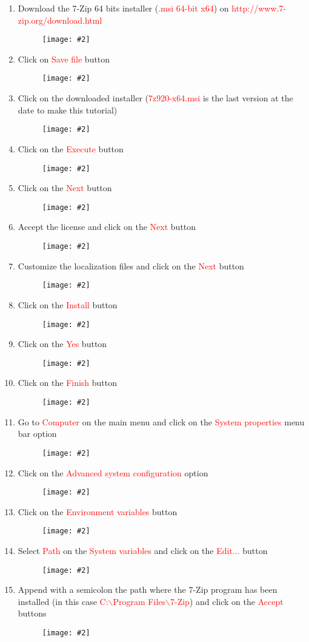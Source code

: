\documentclass[a4paper]{article}
\newcommand{\FIG}[2]
{
	\begin{figure}[ht!]
	\centering
	\texttt{[image: \#2]}
	\end{figure}
}
\newcommand{\FIGURE}[1]{\FIG{0.35}{#1}}
\newcommand{\RED}[1] {\textcolor{red}{#1}}
\begin{document}
\begin{enumerate}

\item Download the 7-Zip 64 bits installer (\RED{.msi 64-bit x64}) on \newline
\RED{http://www.7-zip.org/download.html}

\FIGURE{7zip-1.png.eps}

\clearpage

\item Click on \RED{Save file} button
\FIGURE{7zip-2.png.eps}

\item Click on the downloaded installer (\RED{7z920-x64.msi} is the last version
at the date to make this tutorial)
\FIGURE{7zip-3.png.eps}

\clearpage

\item Click on the \RED{Execute} button
\FIGURE{7zip-4.png.eps}

\item Click on the \RED{Next} button
\FIGURE{7zip-5.png.eps}

\clearpage

\item Accept the license and click on the \RED{Next} button
\FIGURE{7zip-6.png.eps}

\item Customize the localization files and click on the \RED{Next} button
\FIGURE{7zip-7.png.eps}

\clearpage

\item Click on the \RED{Install} button
\FIGURE{7zip-8.png.eps}

\item Click on the \RED{Yes} button
\FIGURE{7zip-9.png.eps}

\clearpage

\item Click on the \RED{Finish} button
\FIGURE{7zip-10.png.eps}

\item Go to \RED{Computer} on the main menu and click on the
\RED{System properties} menu bar option
\FIGURE{7zip-11.png.eps}

\clearpage

\item Click on the \RED{Advanced system configuration} option
\FIGURE{7zip-12.png.eps}

\item Click on the \RED{Environment variables} button
\FIGURE{7zip-13.png.eps}

\clearpage

\item Select \RED{Path} on the \RED{System variables} and click on the
\RED{Edit...} button
\FIGURE{7zip-14.png.eps}

\item Append with a semicolon the path where the 7-Zip program has been
installed (in this case \RED{C:$\backslash$Program Files$\backslash$7-Zip}) and
click on the \RED{Accept} buttons
\FIGURE{7zip-15.png.eps}

\end{enumerate}
\end{document}
